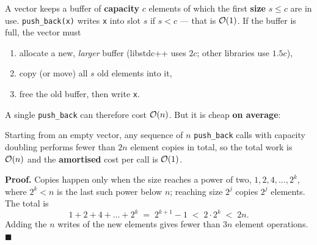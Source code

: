 A vector keeps a buffer of \textbf{capacity} $c$ elements of which the first \textbf{size} $s \le c$ are in use. \texttt{push\_back(x)} writes \texttt{x} into slot $s$ if $s < c$ --- that is $\mathcal{O}(1)$. If the buffer is full, the vector must
\begin{enumerate}[leftmargin=*]
    \item allocate a new, \emph{larger} buffer (libstdc++ uses $2c$; other libraries use $1.5c$),
    \item copy (or move) all $s$ old elements into it,
    \item free the old buffer, then write \texttt{x}.
\end{enumerate}

\begin{diagrambox}
\end{diagrambox}

A single \texttt{push\_back} can therefore cost $\mathcal{O}(n)$. But it is cheap \textbf{on average}:

\begin{theorembox}
Starting from an empty vector, any sequence of $n$ \texttt{push\_back} calls with capacity doubling performs fewer than $2n$ element copies in total, so the total work is $\mathcal{O}(n)$ and the \textbf{amortised} cost per call is $\mathcal{O}(1)$.

\textbf{Proof.} Copies happen only when the size reaches a power of two, $1, 2, 4, \dots, 2^k$, where $2^k < n$ is the last such power below $n$; reaching size $2^j$ copies $2^j$ elements. The total is
\[
1 + 2 + 4 + \dots + 2^k \;=\; 2^{k+1} - 1 \;<\; 2 \cdot 2^k \;<\; 2n.
\]
Adding the $n$ writes of the new elements gives fewer than $3n$ element operations. \hfill$\blacksquare$
\end{theorembox}

